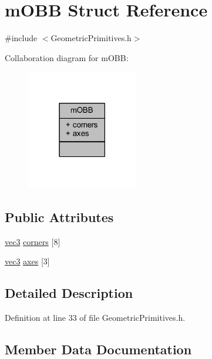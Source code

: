 \hypertarget{structm_o_b_b}{}\section{m\+O\+BB Struct Reference}
\label{structm_o_b_b}


{\ttfamily \#include $<$Geometric\+Primitives.\+h$>$}



Collaboration diagram for m\+O\+BB\+:\nopagebreak
\begin{figure}[H]
\begin{center}
\leavevmode
\includegraphics[width=138pt]{structm_o_b_b__coll__graph}
\end{center}
\end{figure}
\subsection*{Public Attributes}
\begin{DoxyCompactItemize}
\item 
\hyperlink{_types_8h_a3d0ce73e3199de81565fb01632415288}{vec3} \hyperlink{structm_o_b_b_a01fffe0657134010f2937f0f505f293c}{corners} \mbox{[}8\mbox{]}
\item 
\hyperlink{_types_8h_a3d0ce73e3199de81565fb01632415288}{vec3} \hyperlink{structm_o_b_b_a8ea25dd633bf010b91bbb4556d8eb92a}{axes} \mbox{[}3\mbox{]}
\end{DoxyCompactItemize}


\subsection{Detailed Description}


Definition at line 33 of file Geometric\+Primitives.\+h.



\subsection{Member Data Documentation}

